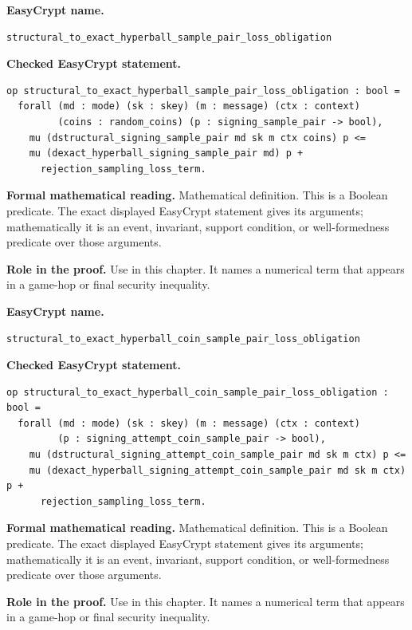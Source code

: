 \begin{formaldefinition}
\noindent\textbf{EasyCrypt name.}
\begin{lstlisting}[language=EasyCrypt,basicstyle=\ttfamily\scriptsize]
structural_to_exact_hyperball_sample_pair_loss_obligation
\end{lstlisting}
\noindent\textbf{Checked EasyCrypt statement.}
\begin{lstlisting}[language=EasyCrypt,basicstyle=\ttfamily\scriptsize]
op structural_to_exact_hyperball_sample_pair_loss_obligation : bool =
  forall (md : mode) (sk : skey) (m : message) (ctx : context)
         (coins : random_coins) (p : signing_sample_pair -> bool),
    mu (dstructural_signing_sample_pair md sk m ctx coins) p <=
    mu (dexact_hyperball_signing_sample_pair md) p +
      rejection_sampling_loss_term.
\end{lstlisting}
\noindent\textbf{Formal mathematical reading.}
Mathematical definition. This is a Boolean predicate.  The exact displayed EasyCrypt statement gives its arguments; mathematically it is an event, invariant, support condition, or well-formedness predicate over those arguments.

\noindent\textbf{Role in the proof.}
Use in this chapter. It names a numerical term that appears in a game-hop or final security inequality.

\end{formaldefinition}

\begin{formaldefinition}
\noindent\textbf{EasyCrypt name.}
\begin{lstlisting}[language=EasyCrypt,basicstyle=\ttfamily\scriptsize]
structural_to_exact_hyperball_coin_sample_pair_loss_obligation
\end{lstlisting}
\noindent\textbf{Checked EasyCrypt statement.}
\begin{lstlisting}[language=EasyCrypt,basicstyle=\ttfamily\scriptsize]
op structural_to_exact_hyperball_coin_sample_pair_loss_obligation : bool =
  forall (md : mode) (sk : skey) (m : message) (ctx : context)
         (p : signing_attempt_coin_sample_pair -> bool),
    mu (dstructural_signing_attempt_coin_sample_pair md sk m ctx) p <=
    mu (dexact_hyperball_signing_attempt_coin_sample_pair md sk m ctx) p +
      rejection_sampling_loss_term.
\end{lstlisting}
\noindent\textbf{Formal mathematical reading.}
Mathematical definition. This is a Boolean predicate.  The exact displayed EasyCrypt statement gives its arguments; mathematically it is an event, invariant, support condition, or well-formedness predicate over those arguments.

\noindent\textbf{Role in the proof.}
Use in this chapter. It names a numerical term that appears in a game-hop or final security inequality.

\end{formaldefinition}

